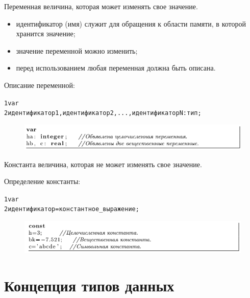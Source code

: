 \documentclass{beamer}
\begin{document}
\begin{frame}[fragile]
\begin{block}{Переменная}
величина, которая может изменять свое значение.
\end{block}
\begin{itemize}
\item идентификатор (имя) служит для обращения к области памяти, в которой хранится значение;
\item значение переменной можно изменить;
\item перед использованием любая переменная должна быть описана. 
\end{itemize}
Описание переменной:
\begin{alltt}
1  var
2    идентификатор1, идентификатор2,...,идентификаторN: тип;
\end{alltt}
\begin{figure}[h]
\centering
\includegraphics[scale=0.75]{images/lec02-pic04.png}
\end{figure}
\end{frame}

\begin{frame}[fragile]
\begin{block}{Константа}
величина, которая не может изменять свое значение.
\end{block}
Определение константы:
\begin{alltt}
1  var
2    идентификатор = константное_выражение;
\end{alltt}
\begin{figure}[h]
\centering
\includegraphics[scale=0.7]{images/lec02-pic05.png}
\end{figure}
\end{frame}

\section{Концепция типов данных}
\end{document}
